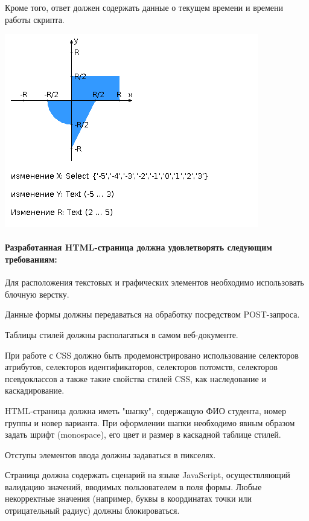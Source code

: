 \documentclass[a4paper, 12pt]{article}
\newenvironment{itemize*}%
  {\begin{itemize}%
    \setlength{\itemsep}{1pt}%
    \setlength{\parskip}{1pt}}%
  {\end{itemize}}
\begin{document}
Кроме того, ответ должен содержать данные о текущем времени и времени работы скрипта.

\includegraphics[scale=0.6]{img/areas.png}

\paragraph{Разработанная HTML-страница должна удовлетворять следующим требованиям:}

\begin{itemize*}
\item Для расположения текстовых и графических элементов необходимо использовать блочную верстку.
\item Данные формы должны передаваться на обработку посредством POST-запроса.
\item Таблицы стилей должны располагаться в самом веб-документе.
\item При работе с CSS должно быть продемонстрировано использование селекторов атрибутов, селекторов идентификаторов, селекторов потомств, селекторов псевдоклассов а также такие свойства стилей CSS, как наследование и каскадирование.
\item HTML-страница должна иметь "шапку", содержащую ФИО студента, номер группы и новер варианта. При оформлении шапки необходимо явным образом задать шрифт (monospace), его цвет и размер в каскадной таблице стилей.
\item Отступы элементов ввода должны задаваться в пикселях.
\item Страница должна содержать сценарий на языке JavaScript, осуществляющий валидацию значений, вводимых пользователем в поля формы. Любые некорректные значения (например, буквы в координатах точки или отрицательный радиус) должны блокироваться.
\end{itemize*}
\end{document}
